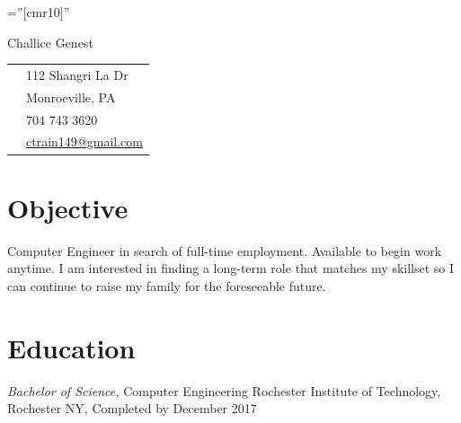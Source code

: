 \documentclass[a4paper,10pt]{article}
\begin{document}
\pagestyle{empty} %

\font\fb=''[cmr10]'' %

\par{\centering
	{\Huge Challice Genest \hfill {\small \begin{tabular}{rl}
	
    \textsc{} & 112 Shangri La Dr \\
    \textsc{} & Monroeville, PA \\
    \textsc{} & 704 743 3620\\
    \textsc{} & \href{mailto:ctrain149@gmail.com}{ctrain149@gmail.com}
   
\end{tabular}}
	}\bigskip\par}


\section{Objective} 
	Computer Engineer in search of full-time employment. Available to begin work anytime. I am interested in finding a long-term role that matches my skillset so I can continue to raise my family for the foreseeable future.

	
\section{Education} {\sl Bachelor of Science,} Computer Engineering
        Rochester Institute of Technology, Rochester NY, 
		Completed by December 2017 %
				
					
\end{document}
